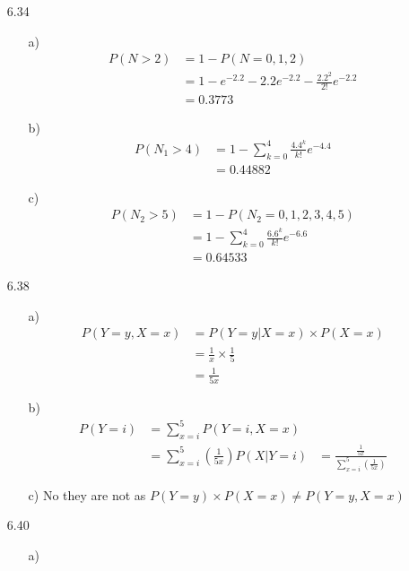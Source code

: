 \documentclass{article}
\begin{document}
\begin{itemize}
\begin{itemize}
    \end{itemize}
    \item [6.34]
    \begin{itemize}
        \item [a)] 
        \begin{align*}
            P(N>2)&=1-P(N=0,1,2)\\
            &=1-e^{-2.2}-2.2e^{-2.2}-\frac{2.2^2}{2!}e^{-2.2}\\
            &=0.3773
        \end{align*}
        \item [b)]
        \begin{align*}
            P(N_1>4)&=1-\sum_{k=0}^4 \frac{4.4^k}{k!}e^{-4.4}\\
            &=0.44882
        \end{align*}
        \item [c)]
        \begin{align*}
            P(N_2>5)&=1-P(N_2=0,1,2,3,4,5)\\
            &=1-\sum_{k=0}^4 \frac{6.6^k}{k!}e^{-6.6}\\
            &=0.64533
        \end{align*}
    \end{itemize}
    \item [6.38]
    \begin{itemize}
        \item [a)]
        \begin{align*}
            P(Y=y,X=x)&=P(Y=y|X=x)\times P(X=x)\\
            &=\frac{1}{x}\times \frac{1}{5}\\
            &=\frac{1}{5x}
        \end{align*}
        \item [b)]
        \begin{align*}
            P(Y=i)&=\sum_{x=i}^{5}P(Y=i,X=x)\\
            &=\sum_{x=i}^5(\frac{1}{5x})
            P(X|Y=i)&=\frac{\frac{1}{5x}}{\sum_{x=i}^5(\frac{1}{5x})}
        \end{align*}
        \item [c)]No they are not as \(P(Y=y)\times P(X=x)\neq P(Y=y,X=x)\)
    \end{itemize}
    \item [6.40]
    \begin{itemize}
        \item [a)]
        \begin{tabular}{c|c|c}

\end{tabular}
\end{itemize}
\end{itemize}
\end{document}
